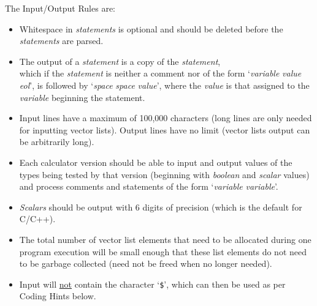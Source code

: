 \documentclass[12pt]{article}
\begin{document}
The Input/Output Rules are:
\begin{indpar}{0.2in}\begin{itemize}

\item Whitespace in {\em statements} is optional and should be deleted
before the {\em statements} are parsed.

\item The output of a {\em statement} is a copy of the {\em statement}, \\
which if the {\em statement} is neither a comment nor of the form
`{\em variable} \TT{=} {\em value} {\em eol}', 
is followed by `{\em space} \TT{=} {\em space} {\em value}', where
the {\em value} is that assigned to the {\em variable} beginning the
statement.

\item Input lines have a maximum of 100,000 characters (long lines
are only needed for inputting vector lists).  Output lines have
no limit (vector lists output can be arbitrarily long).

\item Each calculator version should be able to input and output
values of the types being tested by that version (beginning with
{\em boolean} and {\em scalar} values) and process comments
and statements of the form `{\em variable} \TT{=} {\em variable}'.

\item {\em Scalars} should be output with 6 digits of precision
(which is the default for C/C++).

\item  The total number of vector list elements that need to be
allocated during one program execution will be small enough
that these list elements do not need to be garbage collected
(need not be freed when no longer needed).

\item Input will \underline{not} contain the character `{\tt \$}',
which can then be used as per Coding Hints below.


\end{itemize}\end{indpar}

\newpage
\end{document}
